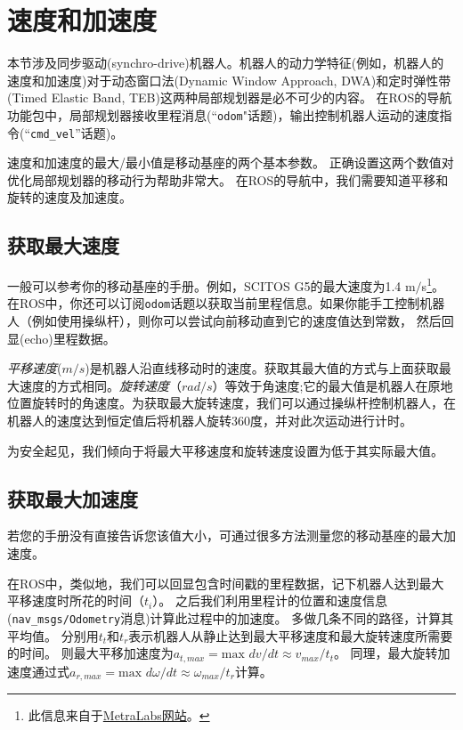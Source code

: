 

\section[Velocity and Acceleration]{速度和加速度}
本节涉及同步驱动(synchro-drive)机器人。机器人的动力学特征(例如，机器人的速度和加速度)对于动态窗口法(Dynamic Window Approach, DWA)和定时弹性带(Timed Elastic Band, TEB)这两种局部规划器是必不可少的内容。
在ROS的导航功能包中，局部规划器接收里程消息(“\texttt{odom}"话题)，输出控制机器人运动的速度指令(“\texttt{cmd_vel}”话题)。

速度和加速度的最大/最小值是移动基座的两个基本参数。
正确设置这两个数值对优化局部规划器的移动行为帮助非常大。
在ROS的导航中，我们需要知道平移和旋转的速度及加速度。	


\subsection[To obtain maximum velocity]{获取最大速度}
一般可以参考你的移动基座的手册。例如，SCITOS G5的最大速度为1.4 m$/$s\footnote{此信息来自于\href{http://www.metralabs.com/en/research}{MetraLabs网站}。}。
在ROS中，你还可以订阅\texttt{odom}话题以获取当前里程信息。如果你能手工控制机器人（例如使用操纵杆），则你可以尝试向前移动直到它的速度值达到常数，
然后回显(echo)里程数据。

\textit{平移速度}($m/s$)是机器人沿直线移动时的速度。获取其最大值的方式与上面获取最大速度的方式相同。\textit{旋转速度}（$rad/s$）等效于角速度;它的最大值是机器人在原地位置旋转时的角速度。为获取最大旋转速度，我们可以通过操纵杆控制机器人，在机器人的速度达到恒定值后将机器人旋转360度，并对此次运动进行计时。

为安全起见，我们倾向于将最大平移速度和旋转速度设置为低于其实际最大值。	




\subsection[To obtain maximum acceleration]{获取最大加速度}

若您的手册没有直接告诉您该值大小，可通过很多方法测量您的移动基座的最大加速度。

在ROS中，类似地，我们可以回显包含时间戳的里程数据，记下机器人达到最大平移速度时所花的时间（$t_{i}$）。
之后我们利用里程计的位置和速度信息(\texttt{nav_msgs/Odometry}消息)计算此过程中的加速度。
多做几条不同的路径，计算其平均值。
分别用$t_t$和$t_r$表示机器人从静止达到最大平移速度和最大旋转速度所需要的时间。
则最大平移加速度为$a_{t,max}=\text{max }dv / dt\approx v_{max}/t_t$。
同理，最大旋转加速度通过式$a_{r,max}=\text{max }d\omega / dt\approx \omega_{max}/t_r$计算。

